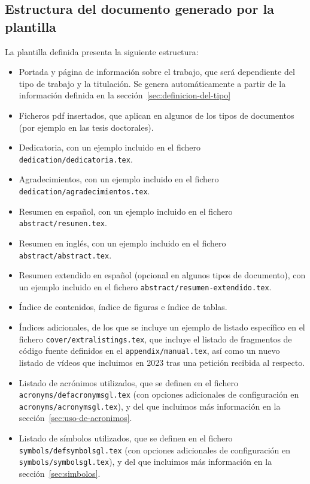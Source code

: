 \subsection{Estructura del documento generado por la plantilla}
\label{sec:estr-del-docum}

La plantilla definida presenta la siguiente estructura:

\begin{itemize}

  \item Portada y página de información sobre el trabajo, que será dependiente del tipo de trabajo y la titulación. Se genera automáticamente a partir de la información definida en la sección~\ref{sec:definicion-del-tipo}

  \item Ficheros pdf insertados, que aplican en algunos de los tipos de documentos (por ejemplo en las tesis doctorales).

  \item Dedicatoria, con un ejemplo incluido en el fichero \texttt{dedication/dedicatoria.tex}.
  \item Agradecimientos, con un ejemplo incluido en el fichero \texttt{dedication/agradecimientos.tex}.


  \item Resumen en español, con un ejemplo incluido en el fichero \texttt{abstract/resumen.tex}.
  \item Resumen en inglés, con un ejemplo incluido en el fichero \texttt{abstract/abstract.tex}.
  \item Resumen extendido en español (opcional en algunos tipos de documento), con un ejemplo incluido en el fichero \texttt{abstract/resumen-extendido.tex}.

  \item Índice de contenidos, índice de figuras e índice de tablas.
  \item Índices adicionales, de los que se incluye un ejemplo de listado específico en el fichero \texttt{cover/extralistings.tex}, que incluye el listado de fragmentos de código fuente definidos en el \texttt{appendix/manual.tex}, así como un nuevo listado de vídeos que incluimos en 2023 tras una petición recibida al respecto.

  \item Listado de acrónimos utilizados, que se definen en el fichero \texttt{acronyms/defacronymsgl.tex} (con opciones adicionales de configuración en \texttt{acronyms/acronymsgl.tex}), y del que incluimos más información en la sección~\ref{sec:uso-de-acronimos}.
  \item Listado de símbolos utilizados, que se definen en el fichero \texttt{symbols/defsymbolsgl.tex} (con opciones adicionales de configuración en \texttt{symbols/symbolsgl.tex}), y del que incluimos más información en la sección~\ref{sec:simbolos}.



\end{itemize}
